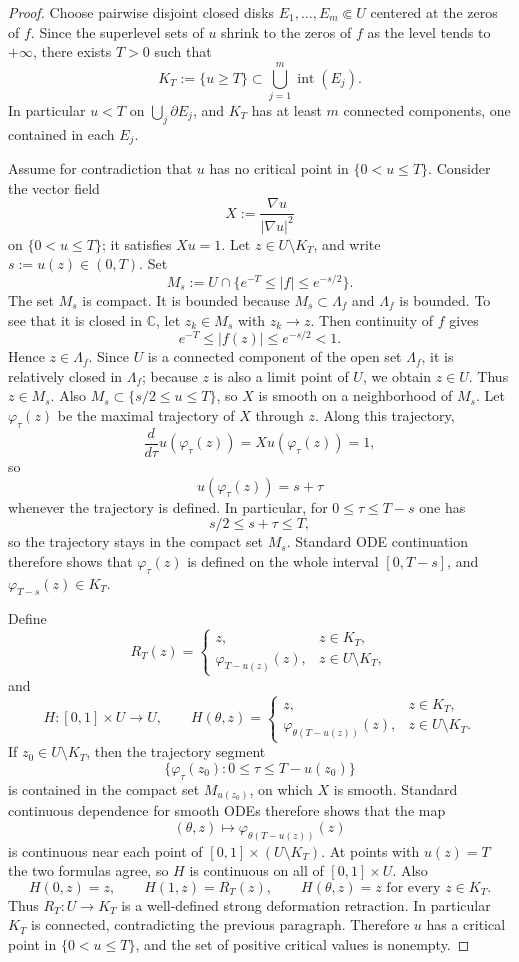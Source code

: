\documentclass[12pt]{amsart}
\theoremstyle{definition}
\theoremstyle{remark}
\begin{document}
\begin{proof} Choose pairwise disjoint closed disks $E_1,\dots,E_m\Subset U$ centered at the zeros of $f$. Since the
superlevel sets of $u$ shrink to the zeros of $f$ as the level tends to $+\infty$, there exists $T>0$ such that
\[
 K_T:=\{u\ge T\}\subset \bigcup_{j=1}^m \operatorname{int}(E_j).
\]
In particular $u<T$ on $\bigcup_j \partial E_j$, and $K_T$ has at least $m$ connected components, one contained in
each $E_j$.

\indent Assume for contradiction that $u$ has no critical point in $\{0<u\le T\}$. Consider the vector field
\[
 X:=\frac{\nabla u}{|\nabla u|^2}
\]
on $\{0<u\le T\}$; it satisfies $Xu=1$. Let $z\in U\setminus K_T$, and write $s:=u(z)\in(0,T)$. Set
\[
 M_s:=U\cap\{e^{-T}\le |f|\le e^{-s/2}\}.
\]
The set $M_s$ is compact. It is bounded because $M_s\subset \Lambda_f$ and $\Lambda_f$ is bounded. To see that it is closed
in $\mathbb{C}$, let $z_k\in M_s$ with $z_k\to z$. Then continuity of $f$ gives
\[
 e^{-T}\le |f(z)|\le e^{-s/2}<1.
\]
Hence $z\in \Lambda_f$. Since $U$ is a connected component of the open set $\Lambda_f$, it is relatively closed in $\Lambda_f$;
because $z$ is also a limit point of $U$, we obtain $z\in U$. Thus $z\in M_s$. Also $M_s\subset\{s/2\le u\le T\}$, so
$X$ is smooth on a neighborhood of $M_s$. Let $\varphi_\tau(z)$ be the maximal trajectory of $X$ through $z$. Along
this trajectory,
\[
 \frac{d}{d\tau}u(\varphi_\tau(z))=Xu(\varphi_\tau(z))=1,
\]
so
\[
 u(\varphi_\tau(z))=s+\tau
\]
whenever the trajectory is defined. In particular, for $0\le \tau\le T-s$ one has
\[
 s/2\le s+\tau\le T,
\]
so the trajectory stays in the compact set $M_s$. Standard ODE continuation therefore shows that
$\varphi_\tau(z)$ is defined on the whole interval $[0,T-s]$, and $\varphi_{T-s}(z)\in K_T$.

\indent Define
\[
R_T(z)=\begin{cases}
z, & z\in K_T,\\
\varphi_{T-u(z)}(z), & z\in U\setminus K_T,
\end{cases}
\]
and
\[
H:[0,1]\times U\to U,\qquad H(\theta,z)=\begin{cases}
z, & z\in K_T,\\
\varphi_{\theta(T-u(z))}(z), & z\in U\setminus K_T.
\end{cases}
\]
If $z_0\in U\setminus K_T$, then the trajectory segment
\[
\{\varphi_\tau(z_0):0\le \tau\le T-u(z_0)\}
\]
is contained in the compact set $M_{u(z_0)}$, on which $X$ is smooth. Standard continuous dependence for smooth ODEs therefore shows that the map
\[
(\theta,z)\mapsto \varphi_{\theta(T-u(z))}(z)
\]
is continuous near each point of $[0,1]\times (U\setminus K_T)$. At points with $u(z)=T$ the two formulas agree, so $H$ is continuous on all of $[0,1]\times U$. Also
\[
H(0,z)=z,\qquad H(1,z)=R_T(z),\qquad H(\theta,z)=z \text{ for every } z\in K_T.
\]
Thus $R_T:U\to K_T$ is a well-defined strong deformation retraction. In particular $K_T$ is connected, contradicting the previous paragraph.
Therefore $u$ has a critical point in $\{0<u\le T\}$, and the set of positive critical values is nonempty.


\end{proof}
\end{document}
